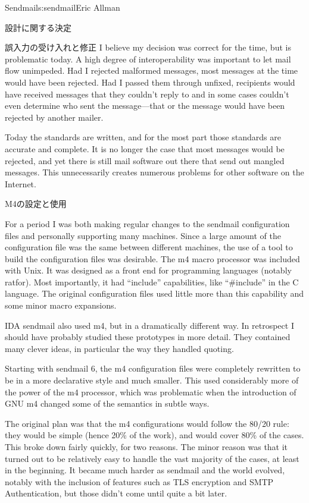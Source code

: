 \begin{aosachapter}{Sendmail}{s:sendmail}{Eric Allman}
\begin{aosasect1}{設計に関する決定}
\begin{aosasect2}{誤入力の受け入れと修正}
I believe my decision was correct for the time, but is problematic
today. A high degree of interoperability was important to let mail
flow unimpeded. Had I rejected malformed messages, most messages at
the time would have been rejected. Had I passed them through unfixed,
recipients would have received messages that they couldn't reply to
and in some cases couldn't even determine who sent the message---that
or the message would have been rejected by another mailer.

Today the standards are written, and for the most part those standards
are accurate and complete. It is no longer the case that most messages
would be rejected, and yet there is still mail software out there that
send out mangled messages. This unnecessarily creates numerous
problems for other software on the Internet.

\end{aosasect2}

\begin{aosasect2}{M4の設定と使用}

For a period I was both making regular changes to the sendmail
configuration files and personally supporting many machines. Since a
large amount of the configuration file was the same between different
machines, the use of a tool to build the configuration files was
desirable. The m4 macro processor was included with Unix. It was
designed as a front end for programming languages (notably
ratfor). Most importantly, it had ``include'' capabilities, like
``\#include'' in the C language.
The original configuration files used little
more than this capability and some minor macro expansions.

IDA sendmail also used m4, but in a dramatically different way. In
retrospect I should have probably studied these prototypes in more
detail. They contained many clever ideas, in particular the way they
handled quoting.

Starting with sendmail 6, the m4 configuration files were completely
rewritten to be in a more declarative style and much smaller. This
used considerably more of the power of the m4 processor, which was
problematic when the introduction of GNU m4 changed some of
the semantics in subtle ways.

The original plan was that the m4
configurations would follow the 80/20 rule: they would be simple
(hence 20\% of the work), and would cover 80\% of the cases. This broke
down fairly quickly, for two reasons.
The minor reason was that it turned out to be relatively easy to
handle the vast majority of the cases, at least in the beginning. It
became much harder as sendmail and the world evolved, notably with the
inclusion of features such as TLS encryption and SMTP Authentication,
but those didn't come until quite a bit later.


\end{aosasect2}
\end{aosasect1}
\end{aosachapter}
